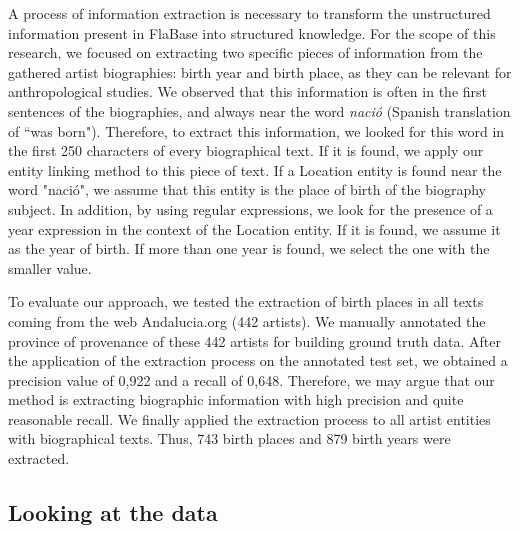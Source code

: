 A process of information extraction is necessary to transform the unstructured information present in FlaBase into structured knowledge. For the scope of this research, we focused on extracting two specific pieces of information from the gathered artist biographies: birth year and birth place, as they can be relevant for anthropological studies. We observed that this information is often in the first sentences of the biographies, and always near the word \textit{naci\'{o}} (Spanish translation of ``was born"). Therefore, to extract this information, we looked for this word in the first 250 characters of every biographical text. If it is found, we apply our entity linking method to this piece of text. If a Location entity is found near the word "naci\'{o}", we assume that this entity is the place of birth of the biography subject. In addition, by using regular expressions, we look for the presence of a year expression in the context of the Location entity. If it is found, we assume it as the year of birth. If more than one year is found, we select the one with the smaller value. 

To evaluate our approach, we tested the extraction of birth places in all texts coming from the web Andalucia.org (442 artists). %
We manually annotated the province of provenance of these 442 artists for building ground truth data. After the application of the extraction process on the annotated test set, we obtained a precision value of 0,922 and a recall of 0,648. Therefore, we may argue that our method is extracting biographic information with high precision and quite reasonable recall. 
We finally applied the extraction process to all artist entities with biographical texts. Thus, %
743 birth places and 879 birth years were extracted. 

\subsection{Looking at the data}
\label{sec:musicology:data-analysis}

